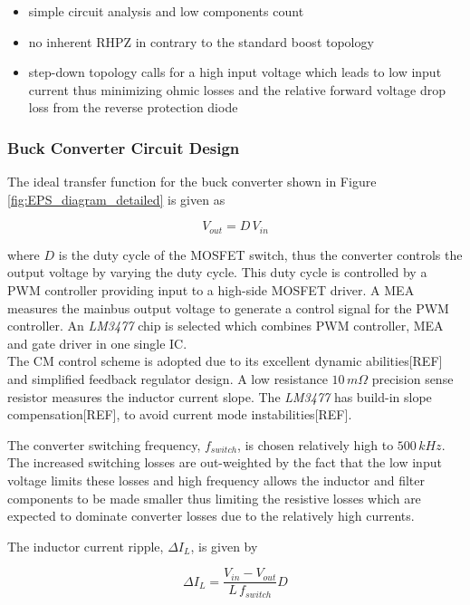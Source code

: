 \begin{itemize}
\item simple circuit analysis and low components count
\item no inherent \ac{RHPZ} in contrary to the standard boost topology
\item step-down topology calls for a high input voltage which leads to low input current thus minimizing ohmic losses and the relative forward voltage drop loss from the reverse protection diode
\end{itemize}


\subsubsection{Buck Converter Circuit Design}
The ideal transfer function for the buck converter shown in Figure \ref{fig:EPS_diagram_detailed} is given as

\begin{equation}
V_{out}=D\,V_{in}
\end{equation}

where $D$ is the duty cycle of the MOSFET switch, thus the converter controls the output voltage by varying the duty cycle. This duty cycle is controlled by a \ac{PWM} controller providing input to a high-side MOSFET driver. A \ac{MEA} measures the mainbus output voltage to generate a control signal for the PWM controller. An \textit{LM3477} chip is selected which combines \ac{PWM} controller, \ac{MEA} and gate driver in one single \ac{IC}.\\
The \ac{CM} control scheme is adopted due to its excellent dynamic abilities[REF] and simplified feedback regulator design. A low resistance $10\,m \Omega$ precision sense resistor measures the inductor current slope. The \textit{LM3477} has build-in slope compensation[REF], to avoid current mode instabilities[REF].

The converter switching frequency, $f_{switch}$, is chosen relatively high to $500\,kHz$. The increased switching losses are out-weighted by the fact that the low input voltage limits these losses and high frequency allows the inductor and filter components to be made smaller thus limiting the resistive losses which are expected to dominate converter losses due to the relatively high currents.

The inductor current ripple, $\Delta I_L$, is given by 

\begin{equation}
\Delta I_L=\dfrac{V_{in}-V_{out}}{L\,f_{switch}}D
\end{equation}

